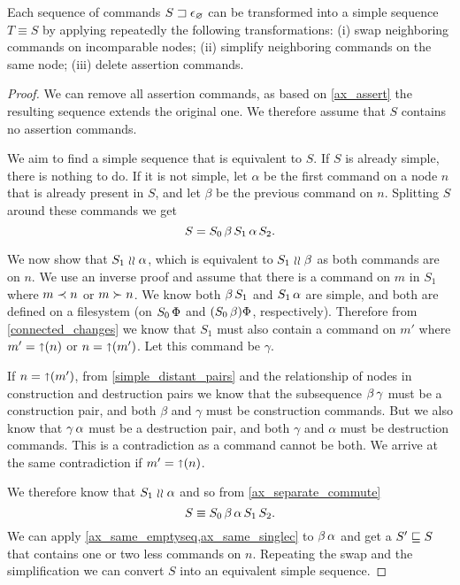 \begin{mylem}
Each sequence of commands ${S}\sqsupset\epsilon_\varnothing$
can be transformed into a simple sequence
$T\equiv S$ by applying repeatedly the following transformations:
{\rm(i)} swap neighboring commands on incomparable nodes;
{\rm(ii)} simplify neighboring commands on the same node;
{\rm(iii)} delete assertion commands.
\end{mylem}
\begin{proof}
We can remove all assertion commands, as based on
\cref{ax_assert} the resulting sequence extends the original one.
We therefore assume that $S$ contains no assertion commands.

\newcommand{\ucx}{\alpha}
\newcommand{\ucy}{\beta}
\newcommand{\ucz}{\gamma}

We aim to find a simple sequence that is equivalent to $S$.
If $S$ is already simple, there is nothing to do.
If it is not simple, let $\ucx$ be the first command
on a node $n$ that is already present in $S$,
and let $\ucy$ be the previous command on $n$.
Splitting $S$ around these commands we get
\[ S = S_0 \cc \ucy \cc S_1 \cc \ucx \cc S_2. \]

We now show that $S_1\indep\ucx$,
which is equivalent to $S_1\indep\ucy$ as both commands are on $n$.
We use an inverse proof and assume that there is a command on $m$ in $S_1$
where $m\prec n$ or $m\succ n$.
We know both $\ucy\cc S_1$ and $S_1\cc\ucx$ are simple,
and both are defined on a filesystem
(on $S_0\,\Phi$ and $(S_0\,\beta)\Phi$, respectively).
Therefore from \cref{connected_changes} we know that
$S_1$ must also contain a command on $m'$ where
$m'=\mathord{\shortuparrow}({n})$ or $n=\mathord{\shortuparrow}({m'})$.
Let this command be $\ucz$.

If $n=\mathord{\shortuparrow}({m'})$,
from \cref{simple_distant_pairs} 
and the relationship of nodes in construction and destruction pairs
we know that the subsequence
$\ucy\cc\ucz$ must be a construction pair,
and both $\ucy$ and $\ucz$ must be construction commands.
But we also know that $\ucz\cc\ucx$ must be a destruction pair,
and both $\ucz$ and $\ucx$ must be destruction commands.
This is a contradiction as a command cannot be both.
We arrive at the same contradiction if $m'=\mathord{\shortuparrow}({n})$.

We therefore know that $S_1\indep\ucx$ and so
from \cref{ax_separate_commute}
\[ S \equiv S_0\cc\ucy\cc\ucx\cc S_1 \cc S_2. \]
We can apply \cref{ax_same_emptyseq,ax_same_singlec} to
$\ucy\cc\ucx$ and get a $S'\sqsubseteq S$ that contains one or two less commands on $n$.
Repeating the swap and the simplification we
can convert $S$ into an equivalent simple sequence.
\end{proof}


